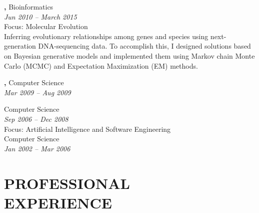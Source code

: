 \documentclass[margin, 10pt]{res} %
\begin{document}
\begin{resume}
{\bf \color{Black}{Doctor of Philosophy},} Bioinformatics \\
{} \hfill \textit{Jun 2010 -- March 2015} \\
Focus: Molecular Evolution  \\
Inferring evolutionary relationships among genes and species using next-generation DNA-sequencing data. To accomplish this, I designed solutions based on Bayesian generative models and implemented them using Markov chain Monte Carlo (MCMC) and Expectation Maximization (EM) methods.

{\bf \color{Black}{Exchange Student},} Computer Science \\
{\color{RubineRed}{University of Limerick, Ireland}} \hfill \textit{Mar 2009 -- Aug 2009} 

{\bf \color{Black}{Master of Science,}} Computer Science \\ %
{\color{RubineRed}{Lahore University of Management Sciences, Pakistan}} \hfill \textit{Sep 2006 -- Dec 2008} \\
Focus: Artificial Intelligence and Software Engineering \\

{\bf \color{Black}{Bachelor of Science,}} Computer Science \\ %
{\color{RubineRed}{University of Peshawar, Pakistan}} \hfill \textit{Jan 2002 -- Mar 2006} \\


\section{PROFESSIONAL \\ EXPERIENCE}


\end{resume}
\end{document}
